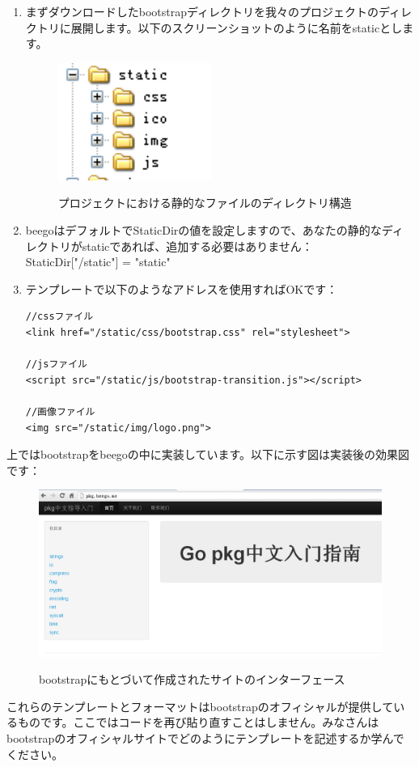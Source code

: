 \begin{enumerate}
  \item まずダウンロードしたbootstrapディレクトリを我々のプロジェクトのディレクトリに展開します。以下のスクリーンショットのように名前をstaticとします。
\begin{figure}[H]
   \includegraphics[width=5cm]{14.1.bootstrap2.png}
   \label{図14.2}
   \caption{プロジェクトにおける静的なファイルのディレクトリ構造}
\end{figure}
  \item beegoはデフォルトでStaticDirの値を設定しますので、あなたの静的なディレクトリがstaticであれば、追加する必要はありません：\\ StaticDir["/static"] = "static"
  \item テンプレートで以下のようなアドレスを使用すればOKです：
\begin{lstlisting}[numbers=none]
//cssファイル
<link href="/static/css/bootstrap.css" rel="stylesheet">

//jsファイル
<script src="/static/js/bootstrap-transition.js"></script>

//画像ファイル
<img src="/static/img/logo.png">
\end{lstlisting}
\end{enumerate}

上ではbootstrapをbeegoの中に実装しています。以下に示す図は実装後の効果図です：


\begin{figure}[H]
   \includegraphics[width=14cm]{14.1.bootstrap3.png}
   \label{図14.3}
   \caption{bootstrapにもとづいて作成されたサイトのインターフェース}
\end{figure}


これらのテンプレートとフォーマットはbootstrapのオフィシャルが提供しているものです。ここではコードを再び貼り直すことはしません。みなさんはbootstrapのオフィシャルサイトでどのようにテンプレートを記述するか学んでください。
